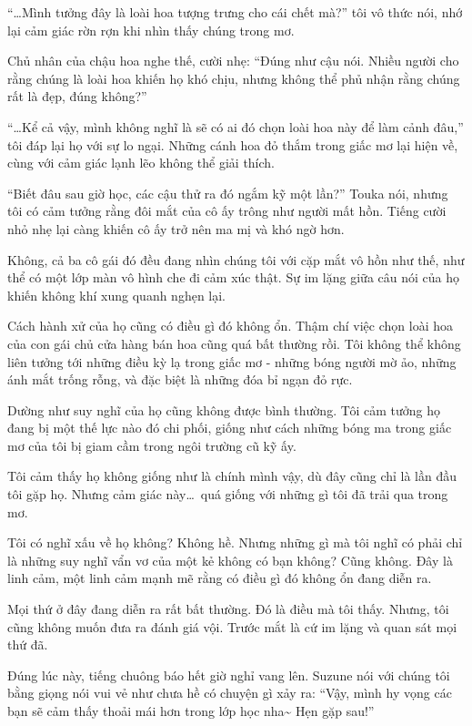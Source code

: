 \documentclass[../main.tex]{subfiles}
\begin{document}
``\dots Mình tưởng đây là loài hoa tượng trưng cho cái chết mà?'' tôi vô thức nói, nhớ lại cảm giác rờn rợn khi nhìn thấy chúng trong mơ.

Chủ nhân của chậu hoa nghe thế, cười nhẹ: ``Đúng như cậu nói. Nhiều người cho rằng chúng là loài hoa khiến họ khó chịu, nhưng không thể phủ nhận rằng chúng rất là đẹp, đúng không?''

``\dots Kể cả vậy, mình không nghĩ là sẽ có ai đó chọn loài hoa này để làm cảnh đâu,'' tôi đáp lại họ với sự lo ngại. Những cánh hoa đỏ thắm trong giấc mơ lại hiện về, cùng với cảm giác lạnh lẽo không thể giải thích.

``Biết đâu sau giờ học, các cậu thử ra đó ngắm kỹ một lần?'' Touka nói, nhưng tôi có cảm tưởng rằng đôi mắt của cô ấy trông như người mất hồn. Tiếng cười nhỏ nhẹ lại càng khiến cô ấy trở nên ma mị và khó ngờ hơn.

Không, cả ba cô gái đó đều đang nhìn chúng tôi với cặp mắt vô hồn như thế, như thể có một lớp màn vô hình che đi cảm xúc thật. Sự im lặng giữa câu nói của họ khiến không khí xung quanh nghẹn lại.

Cách hành xử của họ cũng có điều gì đó không ổn. Thậm chí việc chọn loài hoa của con gái chủ cửa hàng bán hoa cũng quá bất thường rồi. Tôi không thể không liên tưởng tới những điều kỳ lạ trong giấc mơ - những bóng người mờ ảo, những ánh mắt trống rỗng, và đặc biệt là những đóa bỉ ngạn đỏ rực.

Dường như suy nghĩ của họ cũng không được bình thường. Tôi cảm tưởng họ đang bị một thế lực nào đó chi phối, giống như cách những bóng ma trong giấc mơ của tôi bị giam cầm trong ngôi trường cũ kỹ ấy.

Tôi cảm thấy họ không giống như là chính mình vậy, dù đây cũng chỉ là lần đầu tôi gặp họ. Nhưng cảm giác này\dots\ quá giống với những gì tôi đã trải qua trong mơ.

Tôi có nghĩ xấu về họ không? Không hề. Nhưng những gì mà tôi nghĩ có phải chỉ là những suy nghĩ vẩn vơ của một kẻ không có bạn không? Cũng không. Đây là linh cảm, một linh cảm mạnh mẽ rằng có điều gì đó không ổn đang diễn ra.

Mọi thứ ở đây đang diễn ra rất bất thường. Đó là điều mà tôi thấy. Nhưng, tôi cũng không muốn đưa ra đánh giá vội. Trước mắt là cứ im lặng và quan sát mọi thứ đã.

Đúng lúc này, tiếng chuông báo hết giờ nghỉ vang lên. Suzune nói với chúng tôi bằng giọng nói vui vẻ như chưa hề có chuyện gì xảy ra: ``Vậy, mình hy vọng các bạn sẽ cảm thấy thoải mái hơn trong lớp học nha\~{} Hẹn gặp sau!''
\end{document}
